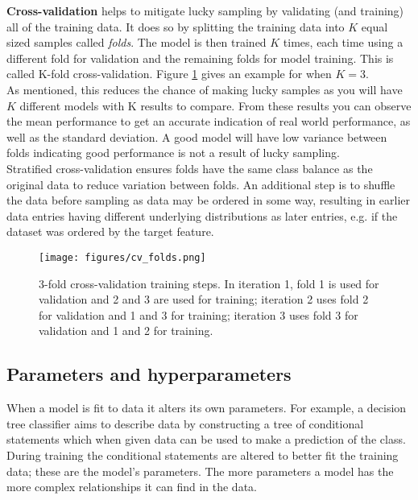 \documentclass[
    author={Kai Hulme},
    supervisor={Dr Jon Bird},
    degree={BSc},
    title={Generative Adversarial Networks as an Augmentation Technique},
    subtitle={for Alzheimer's Disease Detection in MRI Volumes},
    type={Research},
    year={2021} 
]{dissertation}
\begin{document}
\textbf{Cross-validation} helps to mitigate lucky sampling by validating (and training) all of the training data. It does so by splitting the training data into $K$ equal sized samples called \textit{folds}. The model is then trained $K$ times, each time using a different fold for validation and the remaining folds for model training. This is called K-fold cross-validation. Figure \ref{cv_folds} gives an example for when $K=3$. \\

As mentioned, this reduces the chance of making lucky samples as you will have $K$ different models with K results to compare. From these results you can observe the mean performance to get an accurate indication of real world performance, as well as the standard deviation. A good model will have low variance between folds indicating good performance is not a result of lucky sampling. \\

Stratified cross-validation ensures folds have the same class balance as the original data to reduce variation between folds. An additional step is to shuffle the data before sampling as data may be ordered in some way, resulting in earlier data entries having different underlying distributions as later entries, e.g. if the dataset was ordered by the target feature.

\begin{figure}[t]
\centering
\texttt{[image: figures/cv\_folds.png]}
\caption{3-fold cross-validation training steps. In iteration 1, fold 1 is used for validation and 2 and 3 are used for training; iteration 2 uses fold 2 for validation and 1 and 3 for training; iteration 3 uses fold 3 for validation and 1 and 2 for training.}
\label{cv_folds}
\end{figure}

\subsection{Parameters and hyperparameters}

When a model is fit to data it alters its own parameters. For example, a decision tree classifier aims to describe data by constructing a tree of conditional statements which when given data can be used to make a prediction of the class. During training the conditional statements are altered to better fit the training data; these are the model's parameters. The more parameters a model has the more complex relationships it can find in the data. \\
\end{document}
